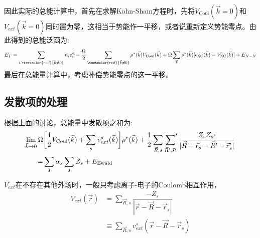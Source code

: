 因此实际的总能计算中，首先在求解\textrm{Kohn-Sham}方程时，先将$V_{\mathrm{Coul}}(\vec k=0)$和$V_{ext}(\vec k=0)$同时置为零，这相当于势能作一平移，或者说重新定义势能零点。由此得到的总能泛函为:~
\begin{equation}
	E_T=\sum_{i,\textcolor{red}{\vec k\neq0}}n_i\varepsilon_i^{\vec k}-\dfrac{\Omega}2\sum_{\textcolor{red}{\vec k\neq 0}}\rho^{\ast}(\vec k)V_{\mathrm{Coul}}(\vec k)+\Omega\sum_{\vec k}\rho^{\ast}(\vec k)[\epsilon_{\mathrm{XC}}(\vec k)-V_{\mathrm{XC}}(\vec k)]+E_{N-N}
	\label{eq:DFT_ENE_G-2}
\end{equation}
最后在总能量计算中，考虑补偿势能零点的这一平移。

\subsection{发散项的处理}
根据上面的讨论，总能量中发散项之和为:~
	\begin{equation}
		\begin{aligned}
			\lim_{\vec k\rightarrow0}\Omega&\bigg[\dfrac12V_{\mathrm{Coul}}(\vec k)+\sum_sv_{ext}^s(\vec k)\bigg]\rho^{\ast}(\vec k)+\dfrac12\sum_{\vec R,s}\sideset{}{^{\prime}}\sum_{\vec R^{\prime},\vec s^{\prime}}\dfrac{Z_sZ_{s^{\prime}}}{|\vec R+\vec r_s-\vec R^{\prime}-\vec r_s^{\prime}|}\\
			=&\sum_s\alpha_s\sum_sZ_s+E_{\mathrm{Ewald}}
		\end{aligned}
		\label{eq:diver-term}
	\end{equation}
	
$V_{ext}$在不存在其他外场时，一般只考虑离子-电子的\textrm{Coulomb}相互作用，
	\begin{equation}
		\begin{aligned}
			V_{ext}(\vec r)&=\sum_{\vec R,s}\dfrac{-Z_s}{|\vec r-\vec R-\vec r_s|}\\
			&\equiv\sum_{\vec R,s}v_{ext}^s(\vec r-\vec R-\vec r_s)
		\end{aligned}
		\label{eq:Ion-ele_Coulomb}
	\end{equation}

